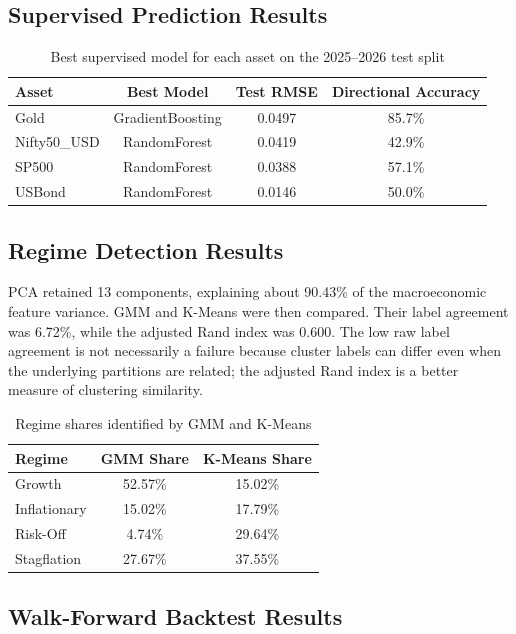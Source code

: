 \documentclass[11pt,a4paper]{article}
\begin{document}
\subsection{Supervised Prediction Results}

\begin{table}[H]
\centering
\caption{Best supervised model for each asset on the 2025--2026 test split}
\begin{tabular}{lccc}
\toprule
\textbf{Asset} & \textbf{Best Model} & \textbf{Test RMSE} & \textbf{Directional Accuracy} \\
\midrule
Gold & GradientBoosting & 0.0497 & 85.7\% \\
Nifty50\_USD & RandomForest & 0.0419 & 42.9\% \\
SP500 & RandomForest & 0.0388 & 57.1\% \\
USBond & RandomForest & 0.0146 & 50.0\% \\
\bottomrule
\end{tabular}
\end{table}

\subsection{Regime Detection Results}

PCA retained 13 components, explaining about 90.43\% of the macroeconomic feature variance. GMM and K-Means were then compared. Their label agreement was 6.72\%, while the adjusted Rand index was 0.600. The low raw label agreement is not necessarily a failure because cluster labels can differ even when the underlying partitions are related; the adjusted Rand index is a better measure of clustering similarity.

\begin{table}[H]
\centering
\caption{Regime shares identified by GMM and K-Means}
\begin{tabular}{lcc}
\toprule
\textbf{Regime} & \textbf{GMM Share} & \textbf{K-Means Share} \\
\midrule
Growth & 52.57\% & 15.02\% \\
Inflationary & 15.02\% & 17.79\% \\
Risk-Off & 4.74\% & 29.64\% \\
Stagflation & 27.67\% & 37.55\% \\
\bottomrule
\end{tabular}
\end{table}

\subsection{Walk-Forward Backtest Results}
\end{document}
